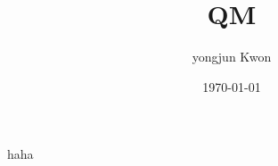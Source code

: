 \documentclass[a4paper,12pt]{article}
\title{QM}
\author{yongjun Kwon}
\date{\today}
\begin{document}
 haha 
\end{document}
